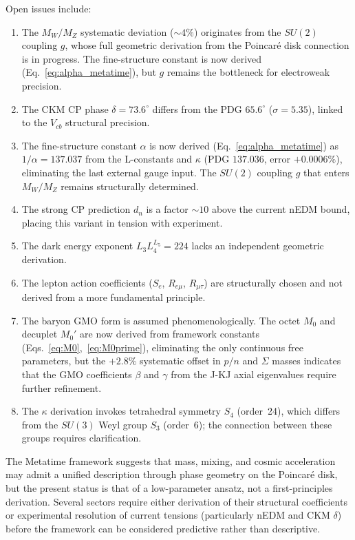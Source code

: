 \documentclass[aps,prd,reprint,twocolumn,showpacs,superscriptaddress]{revtex4-2}
\begin{document}
Open issues include:
\begin{enumerate}
\item The $M_W/M_Z$ systematic deviation ($\sim 4\%$) originates
from the $SU(2)$ coupling $g$, whose full geometric derivation
from the Poincar\'{e} disk connection is in progress.  The
fine-structure constant is now derived (Eq.~\eqref{eq:alpha_metatime}),
but $g$ remains the bottleneck for electroweak precision.
\item The CKM CP phase $\delta = 73.6^\circ$ differs from the PDG
$65.6^\circ$ ($\sigma = 5.35$), linked to the $V_{cb}$ structural
precision.
\item The fine-structure constant $\alpha$ is now derived
(Eq.~\eqref{eq:alpha_metatime}) as $1/\alpha = 137.037$ from
the L-constants and $\kappa$ (PDG $137.036$, error $+0.0006\%$),
eliminating the last external gauge input.  The $SU(2)$ coupling
$g$ that enters $M_W/M_Z$ remains structurally determined.
\item The strong CP prediction $d_n$ is a factor $\sim 10$ above the
current nEDM bound, placing this variant in tension with experiment.
\item The dark energy exponent $L_3 L_4^{L_5} = 224$ lacks an
independent geometric derivation.
\item The lepton action coefficients ($S_e$, $R_{e\mu}$, $R_{\mu\tau}$)
are structurally chosen and not derived from a more fundamental
principle.
\item The baryon GMO form is assumed phenomenologically.  The octet
$M_0$ and decuplet $M_0'$ are now derived from framework constants
(Eqs.~\eqref{eq:M0},~\eqref{eq:M0prime}), eliminating the only
continuous free parameters, but the $+2.8\%$ systematic offset in
$p/n$ and $\Sigma$ masses indicates that the GMO coefficients
$\beta$ and $\gamma$ from the J-KJ axial eigenvalues require
further refinement.
\item The $\kappa$ derivation invokes tetrahedral symmetry $S_4$
(order~24), which differs from the $SU(3)$ Weyl group $S_3$ (order~6);
the connection between these groups requires clarification.
\end{enumerate}

The Metatime framework suggests that mass, mixing, and cosmic
acceleration may admit a unified description through phase geometry
on the Poincar\'{e} disk, but the present status is that of a
low-parameter ansatz, not a first-principles derivation.  Several
sectors require either derivation of their structural coefficients
or experimental resolution of current tensions (particularly nEDM
and CKM $\delta$) before the framework can be considered predictive
rather than descriptive.
\end{document}
